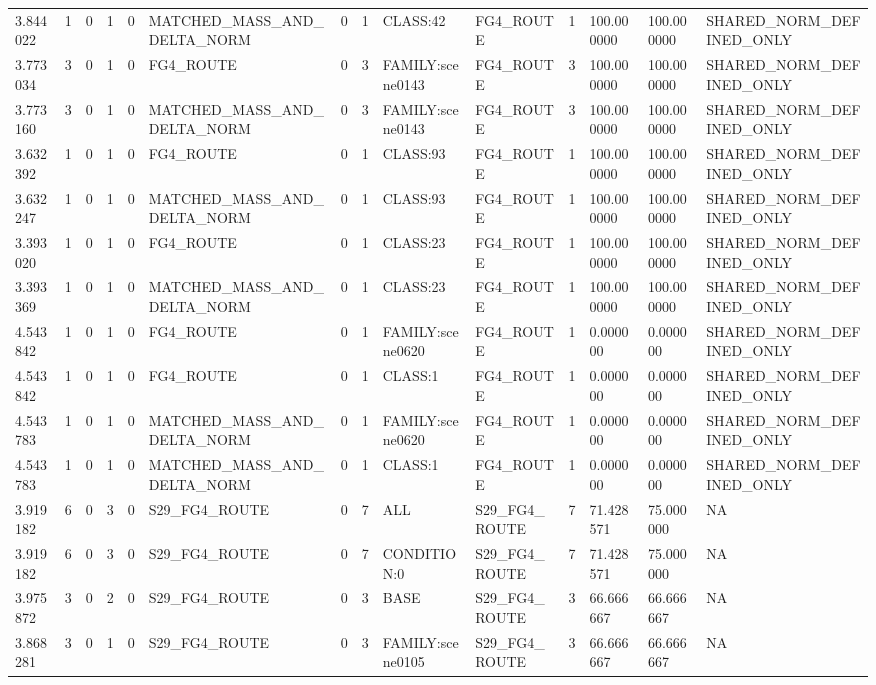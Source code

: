 \begin{tabular}{llllllllllllll}
3.844022 & 1 & 0 & 1 & 0 & MATCHED\_MASS\_AND\_DELTA\_NORM & 0 & 1 & CLASS:42 & FG4\_ROUTE & 1 & 100.000000 & 100.000000 & SHARED\_NORM\_DEFINED\_ONLY \\
3.773034 & 3 & 0 & 1 & 0 & FG4\_ROUTE & 0 & 3 & FAMILY:scene0143 & FG4\_ROUTE & 3 & 100.000000 & 100.000000 & SHARED\_NORM\_DEFINED\_ONLY \\
3.773160 & 3 & 0 & 1 & 0 & MATCHED\_MASS\_AND\_DELTA\_NORM & 0 & 3 & FAMILY:scene0143 & FG4\_ROUTE & 3 & 100.000000 & 100.000000 & SHARED\_NORM\_DEFINED\_ONLY \\
3.632392 & 1 & 0 & 1 & 0 & FG4\_ROUTE & 0 & 1 & CLASS:93 & FG4\_ROUTE & 1 & 100.000000 & 100.000000 & SHARED\_NORM\_DEFINED\_ONLY \\
3.632247 & 1 & 0 & 1 & 0 & MATCHED\_MASS\_AND\_DELTA\_NORM & 0 & 1 & CLASS:93 & FG4\_ROUTE & 1 & 100.000000 & 100.000000 & SHARED\_NORM\_DEFINED\_ONLY \\
3.393020 & 1 & 0 & 1 & 0 & FG4\_ROUTE & 0 & 1 & CLASS:23 & FG4\_ROUTE & 1 & 100.000000 & 100.000000 & SHARED\_NORM\_DEFINED\_ONLY \\
3.393369 & 1 & 0 & 1 & 0 & MATCHED\_MASS\_AND\_DELTA\_NORM & 0 & 1 & CLASS:23 & FG4\_ROUTE & 1 & 100.000000 & 100.000000 & SHARED\_NORM\_DEFINED\_ONLY \\
4.543842 & 1 & 0 & 1 & 0 & FG4\_ROUTE & 0 & 1 & FAMILY:scene0620 & FG4\_ROUTE & 1 & 0.000000 & 0.000000 & SHARED\_NORM\_DEFINED\_ONLY \\
4.543842 & 1 & 0 & 1 & 0 & FG4\_ROUTE & 0 & 1 & CLASS:1 & FG4\_ROUTE & 1 & 0.000000 & 0.000000 & SHARED\_NORM\_DEFINED\_ONLY \\
4.543783 & 1 & 0 & 1 & 0 & MATCHED\_MASS\_AND\_DELTA\_NORM & 0 & 1 & FAMILY:scene0620 & FG4\_ROUTE & 1 & 0.000000 & 0.000000 & SHARED\_NORM\_DEFINED\_ONLY \\
4.543783 & 1 & 0 & 1 & 0 & MATCHED\_MASS\_AND\_DELTA\_NORM & 0 & 1 & CLASS:1 & FG4\_ROUTE & 1 & 0.000000 & 0.000000 & SHARED\_NORM\_DEFINED\_ONLY \\
3.919182 & 6 & 0 & 3 & 0 & S29\_FG4\_ROUTE & 0 & 7 & ALL & S29\_FG4\_ROUTE & 7 & 71.428571 & 75.000000 & NA \\
3.919182 & 6 & 0 & 3 & 0 & S29\_FG4\_ROUTE & 0 & 7 & CONDITION:0 & S29\_FG4\_ROUTE & 7 & 71.428571 & 75.000000 & NA \\
3.975872 & 3 & 0 & 2 & 0 & S29\_FG4\_ROUTE & 0 & 3 & BASE & S29\_FG4\_ROUTE & 3 & 66.666667 & 66.666667 & NA \\
3.868281 & 3 & 0 & 1 & 0 & S29\_FG4\_ROUTE & 0 & 3 & FAMILY:scene0105 & S29\_FG4\_ROUTE & 3 & 66.666667 & 66.666667 & NA \\

\end{tabular}
